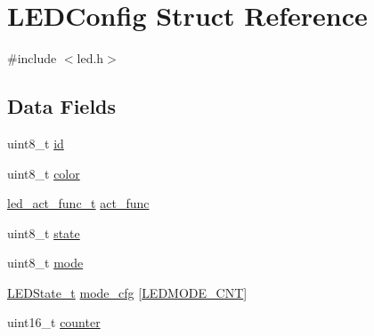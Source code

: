 \hypertarget{structLEDConfig}{\section{L\-E\-D\-Config Struct Reference}
\label{structLEDConfig}
}


{\ttfamily \#include $<$led.\-h$>$}

\subsection*{Data Fields}
\begin{DoxyCompactItemize}
\item 
uint8\-\_\-t \hyperlink{structLEDConfig_a9dfa0e7fd8873d9c1612f4fc5bf8248e}{id}
\item 
uint8\-\_\-t \hyperlink{structLEDConfig_ac41e515cf3d51dc229037923383528c1}{color}
\item 
\hyperlink{led_8h_a0e486f1c6803f7ac2d0b797aa810bb8a}{led\-\_\-act\-\_\-func\-\_\-t} \hyperlink{structLEDConfig_ada428ee3c3ef1a2f104100e67e7b817c}{act\-\_\-func}
\item 
uint8\-\_\-t \hyperlink{structLEDConfig_a79c1d3ad1b2afb9182a988dfc11480a3}{state}
\item 
uint8\-\_\-t \hyperlink{structLEDConfig_aa4e3f811ea4f5fbde59b8ef1042acd02}{mode}
\item 
\hyperlink{structLEDState__t}{L\-E\-D\-State\-\_\-t} \hyperlink{structLEDConfig_a0aa000270a9a88e48df73491ec48c265}{mode\-\_\-cfg} \mbox{[}\hyperlink{led_8h_a57effb96f46e458675a2653d4c543ca2acfe39eac075b00326eb71c682dbdef63}{L\-E\-D\-M\-O\-D\-E\-\_\-\-C\-N\-T}\mbox{]}
\item 
uint16\-\_\-t \hyperlink{structLEDConfig_a59e2b5188b53fd9a015a759c5d6bd66e}{counter}
\end{DoxyCompactItemize}


